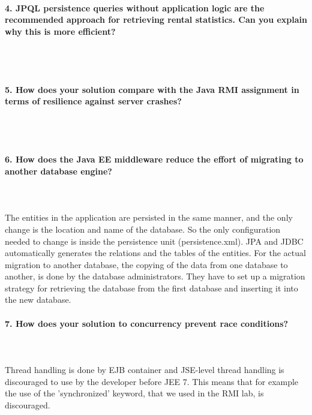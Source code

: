 \documentclass{ds-report}
\begin{document}
	\paragraph{4. JPQL persistence queries without application logic are the recommended approach for retrieving rental statistics. Can you explain why this is more efficient?} \mbox{}\\\\





	\paragraph{5. How does your solution compare with the Java RMI assignment in terms of resilience against server crashes?} \mbox{}\\\\





		\paragraph{6. How does the Java EE middleware reduce the effort of migrating to another database engine?} \mbox{}\\\\
The entities in the application are persisted in the same manner, and the only change is the location and name of the database. So the only configuration needed to change is inside the persistence unit (persistence.xml). JPA and JDBC automatically generates the relations and the tables of the entities. 
For the actual migration to another database, the copying of the data from one database to another, is done by the database administrators. They have to set up a migration strategy for retrieving the database from the first database and inserting it into the new database. 

 

	\paragraph{7. How does your solution to concurrency prevent race conditions?} \mbox{}\\\\
Thread handling is done by EJB container and JSE-level thread handling is discouraged to use by the developer before JEE 7. This means that for example the use of the 'synchronized' keyword, that we used in the RMI lab, is discouraged.
\end{document}
